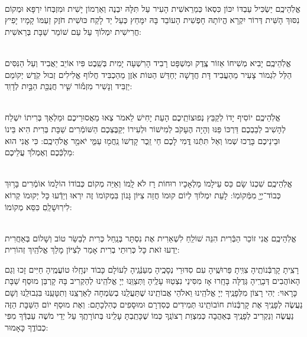 \documentclass[twoside, openany, parskip=half, 11pt]{book}
\begin{document}
\begin{footnotesize}
\\
אֱלֹֽהֵיכֶֽם יַשְׂכִּיל עַבְדּוֹ יִכּוֹן כִּסְאוֹ כְּמֵרֵאשִׁית הָעִיר עַל תִּלָּהּ יִבְנֶה וְאַרְמוֹן יָשִׁית וּמִזְבְּחוֹ יִרְפָּא וּמְקוֹם נִסּוּךְ הָשִּׁית דְּרוֹר יִקְרָא הֱיוֹתָהּ חָפְשִׁית הָעוֹבֵד בָּהּ יִמָּחֵץ כְּעַל יַד לָקַח כּוּשִׁית חֹזֶק זַעְמּוֹ קָמָיו יָפִיץ חֲרִישִׁית יִמְלוֹךְ עַל עַם שׁוֹמֵר שַׁבָּת בְּרֵאשִׁית: 

\\
אֱלֹֽהֵיכֶֽם יָבִיא מְשִׁיחוֹ אֵזוֹר צֶֽדֶק וּמִשְׁפָּט רָבִיד הָרִשְׁעָה יָמִית בְּשֵֽׁבֶט פִּיו אוֹיֵב יַאֲבִיד וְעַל הַנִּסִּים הַלֵּל לִגְמוֹר צָעִיר מֵהַעֲבִיד דָּת חֲדָשָׁה יְחַדֵּשׁ הַטּוֹת אֹֽזֶן מֵהַכְבִּיד חֲלוֹף אֱלִילִים זְבוּל קֹֽדֶשׁ יְקוֹמֵם יַזְבִּיד וְנָשִׁיר מִזְמ֡וֹר שִׁ֤יר חֲנֻכַּ֖ת הַבַּ֣יִת לְדָוִֽד:

\\
אֱלֹֽהֵיכֶֽם יוֹסִיף יָדוֹ לְקַבֵּץ נְפוּצוֹתֵֽיכֶם הָעֵת יָחִישׁ לֵאמֹר צְאוּ מֵאֲסוּרֵיכֶם וּמַלְאַךְ בְּרִיתוֹ יִשְׁלַח לְהָשִׁיב לְבַבְכֶם דַּרְכּוֹ פַּנּוּ וְהָיָה הֶעָקֹב לְמִישׁוֹר וּלְעִירוֹ יְקַבֶּצְכֶם הַשּׁוֹמְֿרִים שַׁבָּת בְּרִית הִיא בֵּינוֹ וּבֵינֵיכֶם בָּרֲכוּ שְׁמוֹ וְאַל תִּתְּֿנוּ דֳּמִי לָכֶם חַי זֵֽכֶר קָדְשׁוֹ נַֽחֲמ֖וּ עַמִּ֑י יֹאמַ֖ר אֱלֹהֵיכֶֽם: כִּי אֲנִי הוּא מַלְכְּֿכֶם וְאֶמְלֹךְ עֲלֵיכֶם:


\\
אֱלֹֽהֵיכֶֽם שִׁכְנוֹ שָׂם כֵּס עֵילָמוֹ מַלְאָכָיו רוּחוֹת רָז לֹא לָֽמוֹ וְאַיֵּה מְקוֹם כְּבוֹדוֹ הוֹלָמוֹ אוֹמְֿרִים בָּר֥וּךְ כְּבוֹד־יְיָ֖ מִמְּֿקוֹמֽוֹ: לָעֵת יִמְלוֹךְ לְיוֹם קוּמוֹ חֲזֵה צִיּוֹן גָּנוֹן בִּמְקוֹמוֹ זֶה יִרְאוּ וְיֵדְֿעוּ כָּל יְקוּמוֹ קְרוֹא לִירֽוּשָׁלַֽםִ כִּסֵּא מְקוֹמוֹ: 

\\
אֱלֹֽהֵיכֶֽם אֲנִי זוֹכֵר הַבְּֿרִית הִנֵּה שׁוֹלֵֽחַ לִשְׁאֵרִית אֶת נִסְתָּר בְּנַֽחַל כְּרִית לְבַשֵּׂר טוֹב וְשָׁלוֹם בְּאַחֲרִית יֵדְעוּ זֹאת כָּל כְּרֽוּתֵי בְרִית אָמַר לְצִיּוֹן מָלַךְ אֱלֹהַֽיִךְ זְהוֹרִית: 

\end{footnotesize}



\sepline

\shabboskiddushhashem 

 
 רָצִֽיתָ קָרְבְּֿנוֹתֶֽיהָ צִוִּֽיתָ פֵּרוּשֶֽׁיהָ עִם סִדּוּרֵי נְסָכֶֽיהָ מְעַנְּֿגֶֽיהָ לְעוֹלָם כָּבוֹד יִנְחָֽלוּ טוֹעֲמֶֽיהָ חַיִּים זָכוּ וְגַם הָאוֹהֲבִים דְּבָרֶֽיהָ גְּדֻלָּה בָּחָֽרוּ אָז מִסִּינַי נִצְטַוּוּ עָלֶֽיהָ 
וַתְּצַוֵּֽנוּ יְיָ אֱלֹהֵֽינוּ לְהַקְרִיב בָּהּ קָרְבַּן מוּסַף שַׁבָּת כָּרָאוּי: יְהִי רָצוֹן מִלְּפָנֶֽיךָ יְיָ אֱלֹהֵֽינוּ וֵאלֹהֵי אֲבוֹתֵֽינוּ שֶׁתַּעֲלֵֽנוּ בְשִׂמְחָה לְאַרְצֵֽנוּ וְתִטָּעֵֽנוּ בִּגְבוּלֵֽנוּ וְשָׁם נַעֲשֶׂה לְפָנֶֽיךָ אֶת קָרְבְּֿנוֹת חוֹבוֹתֵֽינוּ תְּמִידִים כְּסִדְרָם וּמוּסָפִים כְּהִלְכָתָם: וְאֶת מוּסַף יוֹם הַשַּׁבָּת הַזֶּה נַעֲשֶׂה וְנַקְרִיב לְפָנֶֽיךָ בְּאַהֲבָה כְּמִצְוַת רְצוֹנֶֽךָ כְּמוֹ שֶׁכָּתַֽבְתָּ עָלֵֽינוּ בְּתוֹרָתֶֽךָ עַל יְדֵי מֹשֶׁה עַבְדְּֿךָ מִפִּי כְבוֹדֶֽךָ כָּאָמוּר:
\end{document}
